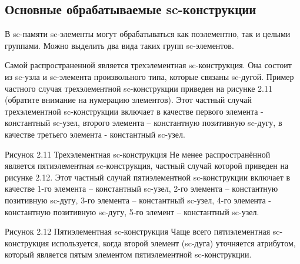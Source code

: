 \subsection{Основные обрабатываемые sc-конструкции}

В sc-памяти sc-элементы могут обрабатываться как поэлементно, так и
целыми группами. Можно выделить два вида таких групп sc-элементов.

Самой распространенной является трехэлементная sc-конструкция. Она
состоит из sc-узла и sc-элемента произвольного типа, которые связаны
sc-дугой. Пример частного случая трехэлементной sc-конструкции
приведен на рисунке 2.11 (обратите внимание на нумерацию
элементов). Этот частный случай трехэлементной sc-конструкции включает
в качестве первого элемента - константный sc-узел, второго элемента –
константную позитивную sc-дугу, в качестве третьего элемента -
константный sc-узел.

Рисунок 2.11 Трехэлементная sc-конструкция
Не менее распространённой является пятиэлементная sc-конструкция, частный случай которой приведен на рисунке 2.12. Этот частный случай пятиэлементной sc-конструкции включает в качестве 1-го элемента – константный sc-узел, 2-го элемента – константную позитивную sc-дугу, 3-го элемента – константный sc-узел, 4-го элемента - константную позитивную sc-дугу, 5-го элемент – константный sc-узел.

 
Рисунок 2.12 Пятиэлементная sc-конструкция
Чаще всего пятиэлементная sc-конструкция используется, когда второй элемент (sc-дуга) уточняется атрибутом, который является пятым элементом пятиэлементной sc-конструкции.



